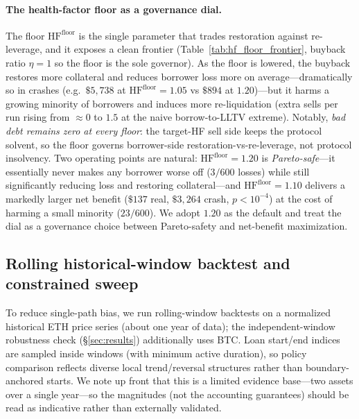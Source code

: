 \documentclass[12pt]{article}
\begin{document}
\paragraph{The health-factor floor as a governance dial.}
The floor $\mathrm{HF}^{\text{floor}}$ is the single parameter that trades restoration against re-leverage, and it exposes a clean frontier (Table~\ref{tab:hf_floor_frontier}, buyback ratio $\eta=1$ so the floor is the sole governor). As the floor is lowered, the buyback restores more collateral and reduces borrower loss more on average---dramatically so in crashes (e.g.\ $\$5{,}738$ at $\mathrm{HF}^{\text{floor}}=1.05$ vs $\$894$ at $1.20$)---but it harms a growing minority of borrowers and induces more re-liquidation (extra sells per run rising from $\approx0$ to $1.5$ at the naive borrow-to-LLTV extreme). Notably, \emph{bad debt remains zero at every floor}: the target-HF sell side keeps the protocol solvent, so the floor governs borrower-side restoration-vs-re-leverage, not protocol insolvency. Two operating points are natural: $\mathrm{HF}^{\text{floor}}=1.20$ is \emph{Pareto-safe}---it essentially never makes any borrower worse off ($3/600$ losses) while still significantly reducing loss and restoring collateral---and $\mathrm{HF}^{\text{floor}}=1.10$ delivers a markedly larger net benefit ($\$137$ real, $\$3{,}264$ crash, $p<10^{-4}$) at the cost of harming a small minority ($23/600$). We adopt $1.20$ as the default and treat the dial as a governance choice between Pareto-safety and net-benefit maximization.


\subsection{Rolling historical-window backtest and constrained sweep}
To reduce single-path bias, we run rolling-window backtests on a normalized historical ETH price series (about one year of data); the independent-window robustness check (\S\ref{sec:results}) additionally uses BTC. Loan start/end indices are sampled inside windows (with minimum active duration), so policy comparison reflects diverse local trend/reversal structures rather than boundary-anchored starts. We note up front that this is a limited evidence base---two assets over a single year---so the magnitudes (not the accounting guarantees) should be read as indicative rather than externally validated.
\end{document}
